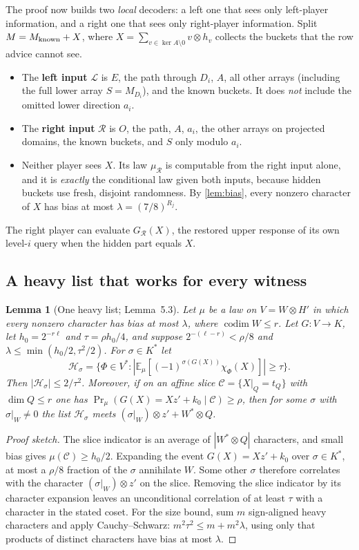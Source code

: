 \documentclass[11pt]{article}
\newtheorem{lemma}[theorem]{Lemma}
\theoremstyle{definition}
\theoremstyle{remark}
\newcommand{\E}{\mathbb E}
\begin{document}
The proof now builds two \emph{local} decoders: a left one that sees only
left-player information, and a right one that sees only right-player
information. Split $M=M_{\rm known}+X$, where $X=\sum_{v\in\ker A\setminus0}
v\otimes h_v$ collects the buckets that the row advice cannot see.
\begin{itemize}
\item The \textbf{left input} $\mathcal L$ is $E$, the path through $D_i$, $A$,
all other arrays (including the full lower array $S=M_{D_i}$), and the known
buckets. It does \emph{not} include the omitted lower direction $a_i$.
\item The \textbf{right input} $\mathcal R$ is $O$, the path, $A$, $a_i$,
the other arrays on projected domains, the known buckets, and $S$ only
modulo $a_i$.
\item Neither player sees $X$. Its law $\mu_{\mathcal R}$ is computable from
the right input alone, and it is \emph{exactly} the conditional law given both
inputs, because hidden buckets use fresh, disjoint randomness. By
\cref{lem:bias}, every nonzero character of $X$ has bias at most
$\lambda=(7/8)^{R_j}$.
\end{itemize}
The right player can evaluate $G_{\mathcal R}(X)$, the restored upper response
of its own level-$i$ query when the hidden part equals $X$.

\subsection{A heavy list that works for every witness}

\begin{lemma}[One heavy list; Lemma~5.3]\label{lem:heavy}
Let $\mu$ be a law on $V=W\otimes H'$ in which every nonzero character has
bias at most $\lambda$, where $\operatorname{codim}W\le r$. Let
$G:V\to K$, let $h_0=2^{-r\ell}$ and $\tau=\rho h_0/4$, and suppose
$2^{-(\ell-r)}<\rho/8$ and $\lambda\le\min(h_0/2,\tau^2/2)$. For
$\sigma\in K^*$ let
\[
 \mathcal H_\sigma=\bigl\{\Phi\in V^*:|\E_\mu[(-1)^{\sigma(G(X))}\chi_\Phi(X)]|\ge\tau\bigr\}.
\]
Then $|\mathcal H_\sigma|\le2/\tau^2$. Moreover, if on an affine slice
$\mathcal C=\{X|_Q=t_Q\}$ with $\dim Q\le r$ one has
$\Pr_\mu(G(X)=Xz'+k_0\mid\mathcal C)\ge\rho$, then for some $\sigma$ with
$\sigma|_W\ne0$ the list $\mathcal H_\sigma$ meets
$(\sigma|_W)\otimes z'+W^*\otimes Q$.
\end{lemma}

\begin{proof}[Proof sketch]
The slice indicator is an average of $|W^*\otimes Q|$ characters, and small
bias gives $\mu(\mathcal C)\ge h_0/2$. Expanding the event
$G(X)=Xz'+k_0$ over $\sigma\in K^*$, at most a $\rho/8$ fraction of the
$\sigma$ annihilate $W$. Some other $\sigma$ therefore correlates with the
character $(\sigma|_W)\otimes z'$ on the slice. Removing the slice indicator
by its character expansion leaves an unconditional correlation of at least
$\tau$ with a character in the stated coset. For the size bound, sum $m$
sign-aligned heavy characters and apply Cauchy--Schwarz:
$m^2\tau^2\le m+m^2\lambda$, using only that products of distinct characters
have bias at most $\lambda$.
\end{proof}
\end{document}
